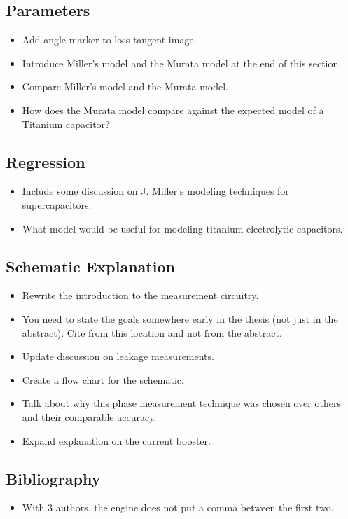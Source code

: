 \documentclass{article}
\begin{document}
\subsection{Parameters}
\begin{itemize}
    \item Add angle marker to loss tangent image.
    \item Introduce Miller's model and the Murata model at the end of this section.
    \item Compare Miller's model and the Murata model.
    \item How does the Murata model compare against the expected model of a Titanium capacitor?
\end{itemize}

\subsection{Regression}
\begin{itemize}
    \item Include some discussion on J. Miller's modeling techniques for supercapacitors.
    \item What model would be useful for modeling titanium electrolytic capacitors.
\end{itemize}

\subsection{Schematic Explanation}
\begin{itemize}
    \item Rewrite the introduction to the measurement circuitry.
    \item You need to state the goals somewhere early in the thesis (not just in the abstract). Cite from this location and not from the abstract.
    \item Update discussion on leakage measurements.
    \item Create a flow chart for the schematic.
    \item Talk about why this phase measurement technique was chosen over others and their comparable accuracy.
    \item Expand explanation on the current booster.
\end{itemize}

\subsection{Bibliography}
\begin{itemize}
    \item With 3 authors, the engine does not put a comma between the first two.
\end{itemize}


\end{document}
